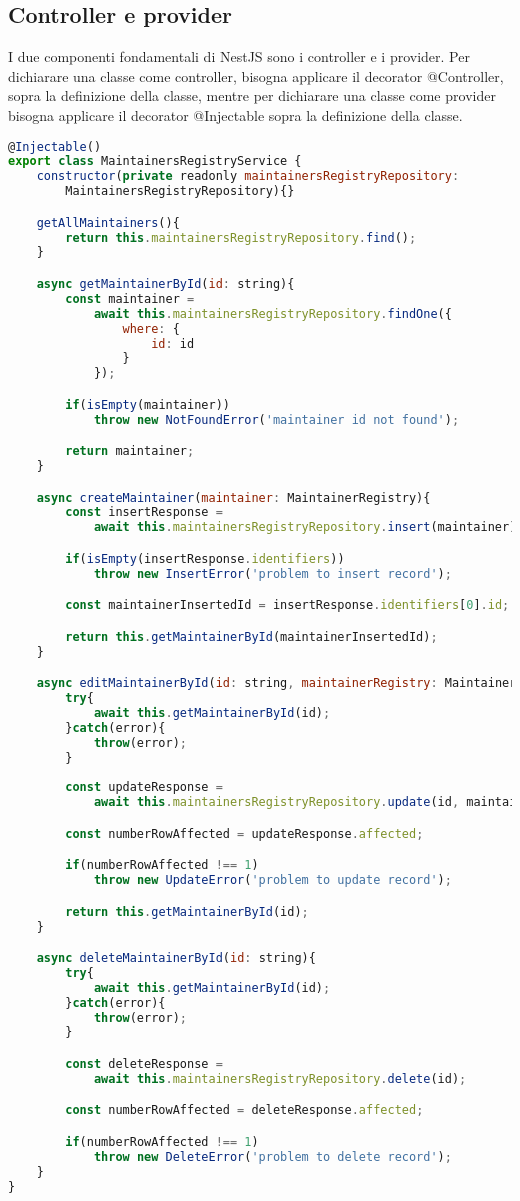 \subsection{Controller e provider}
I due componenti fondamentali di NestJS sono i controller e i provider. 
Per dichiarare una classe come controller, bisogna applicare il decorator @Controller, sopra la 
definizione della classe, mentre per dichiarare una classe come provider bisogna applicare il decorator
@Injectable sopra la definizione della classe.
\\
\begin{lstlisting}[language=JavaScript]
@Injectable()
export class MaintainersRegistryService {
    constructor(private readonly maintainersRegistryRepository: 
        MaintainersRegistryRepository){}

    getAllMaintainers(){
        return this.maintainersRegistryRepository.find();
    }

    async getMaintainerById(id: string){
        const maintainer = 
            await this.maintainersRegistryRepository.findOne({
                where: {
                    id: id
                }
            });

        if(isEmpty(maintainer))
            throw new NotFoundError('maintainer id not found');

        return maintainer;
    }

    async createMaintainer(maintainer: MaintainerRegistry){
        const insertResponse = 
            await this.maintainersRegistryRepository.insert(maintainer);

        if(isEmpty(insertResponse.identifiers))
            throw new InsertError('problem to insert record');

        const maintainerInsertedId = insertResponse.identifiers[0].id;

        return this.getMaintainerById(maintainerInsertedId);
    }

    async editMaintainerById(id: string, maintainerRegistry: MaintainerRegistry){
        try{
            await this.getMaintainerById(id);    
        }catch(error){
            throw(error);
        }
        
        const updateResponse = 
            await this.maintainersRegistryRepository.update(id, maintainerRegistry);

        const numberRowAffected = updateResponse.affected;

        if(numberRowAffected !== 1)
            throw new UpdateError('problem to update record');

        return this.getMaintainerById(id);
    }

    async deleteMaintainerById(id: string){
        try{
            await this.getMaintainerById(id);    
        }catch(error){
            throw(error);
        }

        const deleteResponse = 
            await this.maintainersRegistryRepository.delete(id);

        const numberRowAffected = deleteResponse.affected;

        if(numberRowAffected !== 1)
            throw new DeleteError('problem to delete record');
    }
}
\end{lstlisting}
